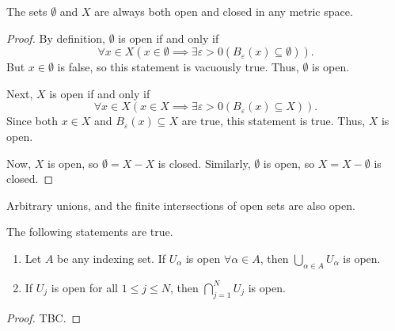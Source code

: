 \begin{nthm}
  The sets $\emptyset$ and $X$ are always both open and closed in any metric space.
\end{nthm}
\begin{proof}
  By definition, $\emptyset$ is open if and only if
  \begin{equation*}
    \forall x \in X \left(x \in \emptyset \implies \exists\varepsilon>0 (B_{\varepsilon}(x) \subseteq \emptyset)\right).
  \end{equation*}
  But $x \in \emptyset$ is false, so this statement is vacuously true. Thus, $\emptyset$ is open.

  Next, $X$ is open if and only if
  \begin{equation*}
    \forall x \in X \left(x \in X \implies \exists\varepsilon>0 (B_{\varepsilon}(x) \subseteq X)\right).
  \end{equation*}
  Since both $x \in X$ and $B_{\varepsilon}(x) \subseteq X$ are true, this statement is true. Thus, $X$ is open.

  Now, $X$ is open, so $\emptyset = X-X$ is closed. Similarly, $\emptyset$ is open, so $X = X-\emptyset$ is closed.
\end{proof}

Arbitrary unions, and the finite intersections of open sets are also open.
\begin{nthm}
  The following statements are true.
  \begin{enumerate}
  \item Let $A$ be any indexing set. If $U_{\alpha}$ is open $\forall\alpha\in A$, then $\bigcup_{\alpha\in A} U_{\alpha}$ is open.
  \item If $U_{j}$ is open for all $1 \leq j \leq N$, then $\bigcap_{j=1}^{N} U_{j}$ is open.
  \end{enumerate}
\end{nthm}
\begin{proof}
  TBC.
\end{proof}

